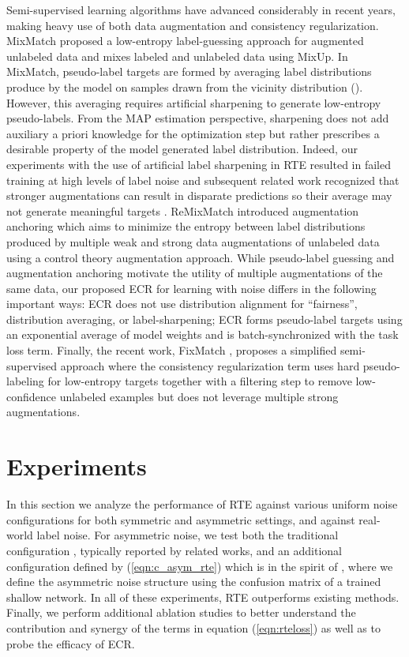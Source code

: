 \documentclass{article}
\begin{document}
Semi-supervised learning algorithms have advanced considerably in recent years, making heavy use of both data augmentation and consistency regularization.  MixMatch \cite{48557} proposed a low-entropy label-guessing approach for augmented unlabeled data and mixes labeled and unlabeled data using MixUp.  In MixMatch, pseudo-label targets are formed by averaging label distributions produce by the model on samples drawn from the vicinity distribution ().  However, this averaging requires artificial sharpening to generate low-entropy pseudo-labels.  From the MAP estimation perspective, sharpening does not add auxiliary a priori knowledge for the optimization step but rather prescribes a desirable property of the model generated label distribution.  Indeed, our experiments with the use of artificial label sharpening in RTE resulted in failed training at high levels of label noise and subsequent related work recognized that stronger augmentations can result in disparate predictions so their average may not generate meaningful targets \cite{Berthelot2020ReMixMatch:}.  ReMixMatch \cite{Berthelot2020ReMixMatch:} introduced augmentation anchoring which aims to minimize the entropy between label distributions produced by multiple weak and strong data augmentations of unlabeled data using a control theory augmentation approach.  While pseudo-label guessing and augmentation anchoring motivate the utility of multiple augmentations of the same data, our proposed ECR for learning with noise differs in the following important ways: ECR does not use distribution alignment for ``fairness'', distribution averaging, or label-sharpening; ECR forms pseudo-label targets using an exponential average of model weights and is batch-synchronized with the task loss term.  Finally, the recent work, FixMatch \cite{49534}, proposes a simplified semi-supervised approach where the consistency regularization term uses hard pseudo-labeling for low-entropy targets together with a filtering step to remove low-confidence unlabeled examples but does not leverage multiple strong augmentations.



\section{Experiments}
\label{sec:expt}
In this section we analyze the performance of RTE against various uniform noise configurations for both symmetric and asymmetric settings, and against real-world label noise.  For asymmetric noise, we test both the traditional configuration \cite{patrini2016}, typically reported by related works, and an additional configuration defined by (\ref{eqn:c_asym_rte}) which is in the spirit of \cite{lee2019}, where we define the asymmetric noise structure using the confusion matrix of a trained shallow network.  In all of these experiments, RTE outperforms existing methods.  Finally, we perform additional ablation studies to better understand the contribution and synergy of the terms in equation (\ref{eqn:rteloss}) as well as to probe the efficacy of ECR.
\end{document}
